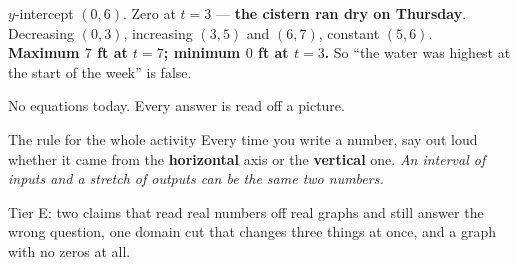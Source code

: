 \documentclass[aspectratio=169, 11pt]{beamer}
\begin{document}
\begin{frame}[t, plain]
  \begin{center}
  \end{center}
  \vspace{-0.3cm}
  $y$-intercept $(0,6)$. \quad Zero at $t=3$ --- \textbf{the cistern ran dry on Thursday}. \quad
  Decreasing $(0,3)$, increasing $(3,5)$ and $(6,7)$, constant $(5,6)$.\\
  \textbf{Maximum $7$ ft at $t=7$; minimum $0$ ft at $t=3$.} So ``the water was highest at the start
  of the week'' is false.
\end{frame}

\begin{frame}[t, plain]
  No equations today. Every answer is read off a picture.
  \begin{block}{The rule for the whole activity}
    Every time you write a number, say out loud whether it came from the \textbf{horizontal} axis or
    the \textbf{vertical} one. \emph{An interval of inputs and a stretch of outputs can be the same
    two numbers.}
  \end{block}
  \vspace{0.15cm}
  Tier E: two claims that read real numbers off real graphs and still answer the wrong question, one
  domain cut that changes three things at once, and a graph with no zeros at all.
\end{frame}
\end{document}
